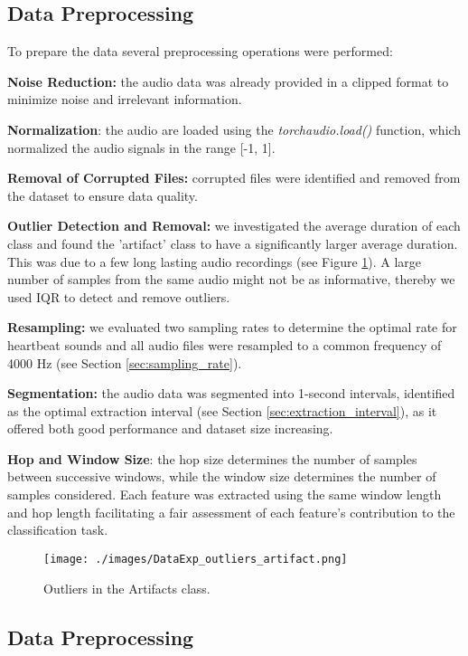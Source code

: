 \subsection{Data Preprocessing}
To prepare the data several preprocessing operations were performed:

\vspace{0.2cm}\noindent
\textbf{Noise Reduction:} the audio data was already provided in a clipped format 
to minimize noise and irrelevant information.

\vspace{0.2cm}\noindent
\textbf{Normalization}: the audio are loaded using the \textit{torchaudio.load()} 
function, which normalized the audio signals in the range [-1, 1]. 

\vspace{0.2cm}\noindent
\textbf{Removal of Corrupted Files:} corrupted files were identified and removed 
from the dataset to ensure data quality.

\vspace{0.2cm}\noindent
\textbf{Outlier Detection and Removal:} we investigated the average duration of 
each class and found the 'artifact' class to have a significantly larger average 
duration. This was due to a few long lasting audio 
recordings (see Figure \ref{fig:DataExp_outliers_Artifacts}). A large number of samples from 
the same audio might not be as informative, thereby we used IQR to detect and remove outliers.

\vspace{0.2cm}\noindent
\textbf{Resampling:} we evaluated two sampling rates to determine the optimal rate 
for heartbeat sounds and all audio files were resampled to a common frequency of 4000 Hz 
(see Section \ref{sec:sampling_rate}).

\vspace{0.2cm}\noindent
\textbf{Segmentation:} the audio data was segmented into 1-second intervals, 
identified as the optimal extraction interval (see Section \ref{sec:extraction_interval}), as
it offered both good performance and dataset size increasing.

\vspace{0.2cm}\noindent
\textbf{Hop and Window Size}: the hop size determines the number of samples between 
successive windows, while the window size determines the number of samples considered. 
Each feature was extracted using the same window length and hop length facilitating a 
fair assessment of each feature's contribution to the classification task. 

\begin{figure}[H]
	\centering
	\texttt{[image: ./images/DataExp\_outliers\_artifact.png]}
	\caption{Outliers in the Artifacts class.}
	\label{fig:DataExp_outliers_Artifacts}
 \end{figure}\subsection{Data Preprocessing}
